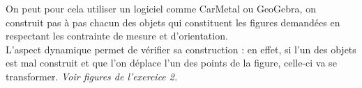     On peut pour cela utiliser un logiciel comme CarMetal ou GeoGebra, on construit pas à pas chacun des objets qui constituent les figures demandées en respectant les contrainte de mesure et d'orientation. \\
    L'aspect \og dynamique \fg{} permet de vérifier sa construction : en effet, si l'un des objets est mal construit et que l'on déplace l'un des points de la figure, celle-ci va se transformer. {\it Voir figures de l'exercice 2.}
